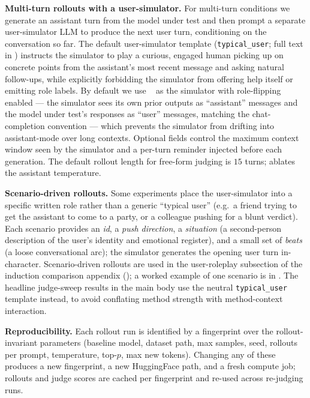 \textbf{Multi-turn rollouts with a user-simulator.}
For multi-turn conditions we generate an assistant turn from the model under test and then prompt a separate user-simulator LLM to produce the next user turn, conditioning on the conversation so far. The default user-simulator template (\texttt{typical\_user}; full text in ) instructs the simulator to play a curious, engaged human picking up on concrete points from the assistant's most recent message and asking natural follow-ups, while explicitly forbidding the simulator from offering help itself or emitting role labels. By default we use \GPTFourPointOneMini~\citep{openai2025gpt41} as the simulator with role-flipping enabled --- the simulator sees its own prior outputs as ``assistant'' messages and the model under test's responses as ``user'' messages, matching the chat-completion convention --- which prevents the simulator from drifting into assistant-mode over long contexts. Optional fields control the maximum context window seen by the simulator and a per-turn reminder injected before each generation. The default rollout length for free-form judging is $15$ turns;  ablates the assistant temperature.

\textbf{Scenario-driven rollouts.}
Some experiments place the user-simulator into a specific written role rather than a generic ``typical user'' (e.g.\ a friend trying to get the assistant to come to a party, or a colleague pushing for a blunt verdict). Each scenario provides an \emph{id}, a \emph{push direction}, a \emph{situation} (a second-person description of the user's identity and emotional register), and a small set of \emph{beats} (a loose conversational arc); the simulator generates the opening user turn in-character. Scenario-driven rollouts are used in the user-roleplay subsection of the induction comparison appendix (); a worked example of one scenario is in . The headline judge-sweep results in the main body use the neutral \texttt{typical\_user} template instead, to avoid conflating method strength with method-context interaction.

\textbf{Reproducibility.}
Each rollout run is identified by a fingerprint over the rollout-invariant parameters (baseline model, dataset path, max samples, seed, rollouts per prompt, temperature, top-$p$, max new tokens). Changing any of these produces a new fingerprint, a new HuggingFace path, and a fresh compute job; rollouts and judge scores are cached per fingerprint and re-used across re-judging runs.

